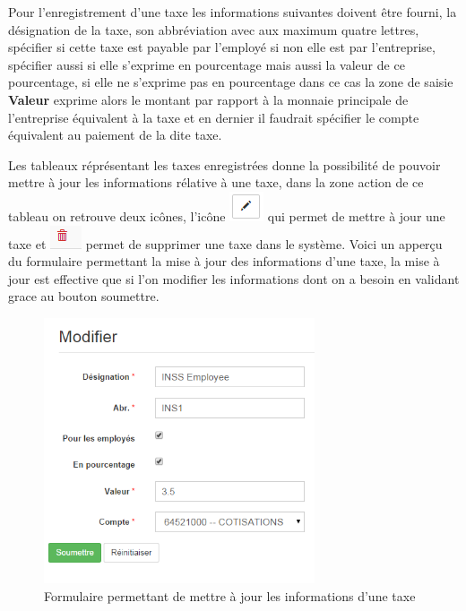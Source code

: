 \documentclass[12pt,a4paper]{report}
\begin{document}
Pour l'enregistrement d'une taxe les informations suivantes doivent être fourni, la désignation de la taxe, son abbréviation avec aux maximum quatre lettres, spécifier si cette taxe est payable par l'employé si non elle est par l'entreprise, spécifier aussi si elle s'exprime en pourcentage mais aussi la valeur de ce pourcentage, si elle ne s'exprime pas en pourcentage dans ce cas la zone de saisie \textbf{Valeur} exprime alors le montant par rapport à la monnaie principale de l'entreprise équivalent à la taxe et en dernier il faudrait spécifier le compte équivalent au paiement de la dite taxe. 

Les tableaux réprésentant les taxes enregistrées donne la possibilité de pouvoir mettre à jour les informations rélative à une taxe, dans la zone action de ce tableau on retrouve deux icônes, l'icône \includegraphics[scale=0.7]{pic/EditBlack.png} qui permet de mettre à jour une taxe et \includegraphics[scale=0.7]{pic/DeleteWRed.png} permet de supprimer une taxe dans le système.
Voici un apperçu du formulaire permettant la mise à jour des informations d'une taxe, la mise à jour est effective que si l'on modifier les informations dont on a besoin en validant grace au bouton soumettre. 

\begin{figure}[h]
\begin{center}
\includegraphics[width=8cm]{pic/ModTaxe.png}
\end{center}
\caption{Formulaire permettant de mettre à jour les informations d'une taxe}
\label{Formulaire permettant de mettre à jour les informations d'une taxe}
\end{figure} 
\newpage
\end{document}
